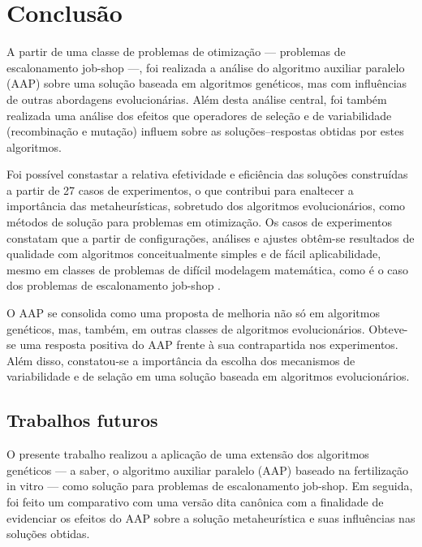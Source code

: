 \documentclass[relatorio,nocolorlinks]{inf-ufg}
\begin{document}
\chapter{Conclus\~{a}o}
\label{conclusao}

A partir de uma classe de problemas de otimiza\c{c}\~{a}o --- problemas de escalonamento job-shop ---, foi realizada a an\'{a}lise do algoritmo
auxiliar paralelo (AAP) sobre uma solu\c{c}\~{a}o baseada em algoritmos gen\'{e}ticos, mas com influ\^{e}ncias de outras abordagens
evolucion\'{a}rias. Al\'{e}m desta an\'{a}lise central, foi tamb\'{e}m realizada uma an\'{a}lise dos efeitos que operadores de sele\c{c}\~{a}o
e de variabilidade (recombina\c{c}\~{a}o e muta\c{c}\~{a}o) influem sobre as solu\c{c}\~{o}es--respostas obtidas por estes algoritmos.

Foi poss\'{i}vel constastar a relativa efetividade e efici\^{e}ncia das solu\c{c}\~{o}es constru\'{i}das a partir de 27 casos de experimentos,
o que contribui para enaltecer a import\^{a}ncia das metaheur\'{i}sticas, sobretudo dos algoritmos evolucion\'{a}rios, como m\'{e}todos de
solu\c{c}\~{a}o para problemas em otimiza\c{c}\~{a}o. Os casos de experimentos constatam que a partir de configura\c{c}\~{o}es, an\'{a}lises e
ajustes obt\^{e}m-se resultados de qualidade com algoritmos conceitualmente simples e de f\'{a}cil aplicabilidade, mesmo em classes de problemas
de dif\'{i}cil modelagem matem\'{a}tica, como \'{e} o caso dos problemas de escalonamento job-shop \cite{French1982}.

O AAP se consolida como uma proposta de melhoria n\~{a}o s\'{o} em algoritmos gen\'{e}ticos, mas, tamb\'{e}m, em outras classes de algoritmos
evolucion\'{a}rios. Obteve-se uma resposta positiva do AAP frente \`{a} sua contrapartida nos experimentos. Al\'{e}m disso, constatou-se a
import\^{a}ncia da escolha dos mecanismos de variabilidade e de sela\c{c}\~{a}o em uma solu\c{c}\~{a}o baseada em algoritmos evolucion\'{a}rios.

\section{Trabalhos futuros}

O presente trabalho realizou a aplica\c{c}\~{a}o de uma extens\~{a}o dos algoritmos gen\'{e}ticos --- a saber, o algoritmo auxiliar
paralelo (AAP) baseado na fertiliza\c{c}\~{a}o in vitro --- como solu\c{c}\~{a}o para problemas de escalonamento job-shop. Em seguida,
foi feito um comparativo com uma vers\~{a}o dita can\^{o}nica com a finalidade de evidenciar os efeitos do AAP sobre a solu\c{c}\~{a}o
metaheur\'{i}stica e suas influ\^{e}ncias nas solu\c{c}\~{o}es obtidas.
\end{document}
